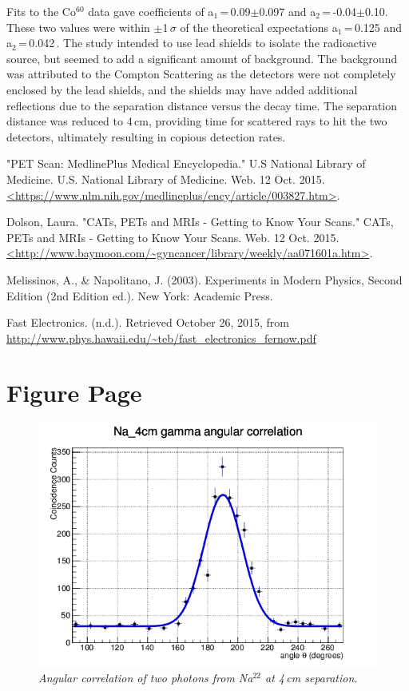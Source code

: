 \documentclass[aps,prl,twocolumn,superscriptaddress]{revtex4-1}
\begin{document}
Fits to the Co$^{60}$ data gave coefficients of a$_1$\,=\,0.09$\pm$0.097 and a$_2$\,=\,-0.04$\pm$0.10. These two values were within $\pm$1\,$\sigma$ of the theoretical expectations a$_1$\,=\,0.125 and a$_2$\,=\,0.042\,\cite{3}. The study intended to use lead shields to isolate the radioactive source, but seemed to add a significant amount of background. The background was attributed to the Compton Scattering as the detectors were not completely enclosed by the lead shields, and the shields may have added additional reflections due to the separation distance versus the decay time. The separation distance was reduced to 4\,cm, providing time for scattered rays to hit the two detectors, ultimately resulting in copious detection rates.


\setlength{\parindent}{0cm}

\begin{thebibliography}{99}  %

 "PET Scan: MedlinePlus Medical Encyclopedia." U.S National Library of Medicine. U.S. National Library of Medicine. Web. 12 Oct. 2015. \url{<https://www.nlm.nih.gov/medlineplus/ency/article/003827.htm>}.     %

 Dolson, Laura. "CATs, PETs and MRIs - Getting to Know Your Scans." CATs, PETs and MRIs - Getting to Know Your Scans. Web. 12 Oct. 2015. \url{<http://www.baymoon.com/~gyncancer/library/weekly/aa071601a.htm>}.

 Melissinos, A., \& Napolitano, J. (2003). Experiments in Modern Physics, Second Edition (2nd Edition ed.). New York: Academic Press.

 Fast Electronics. (n.d.). Retrieved October 26, 2015, from \url{http://www.phys.hawaii.edu/~teb/fast_electronics_fernow.pdf}


\end{thebibliography}

\clearpage
\section{Figure Page}
\begin{figure}[h!]
  \begin{center}
\centerline{\includegraphics[width=3.in]{Na04.png}}
\caption{\it \small{Angular correlation of two photons from Na$^{22}$ at 4\,cm separation. \label{fig1}}}
  \end{center}
\end{figure}
\end{document}

